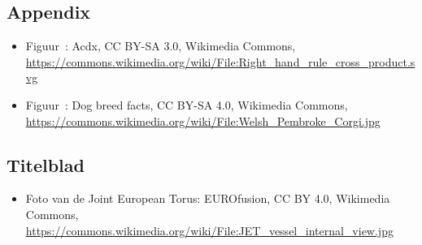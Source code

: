 \documentclass{ximera}
\begin{document}
\subsection*{Appendix}
\begin{itemize}
        \item Figuur~: Acdx, CC BY-SA 3.0, Wikimedia Commons, \url{https://commons.wikimedia.org/wiki/File:Right_hand_rule_cross_product.svg}
        \item Figuur~: Dog breed facts, CC BY-SA 4.0, Wikimedia Commons, \url{https://commons.wikimedia.org/wiki/File:Welsh_Pembroke_Corgi.jpg}
\end{itemize}

\subsection*{Titelblad}
\begin{itemize}
        \item Foto van de Joint European Torus: EUROfusion, CC BY 4.0, Wikimedia Commons, \url{https://commons.wikimedia.org/wiki/File:JET_vessel_internal_view.jpg}
\end{itemize}
\end{document}

